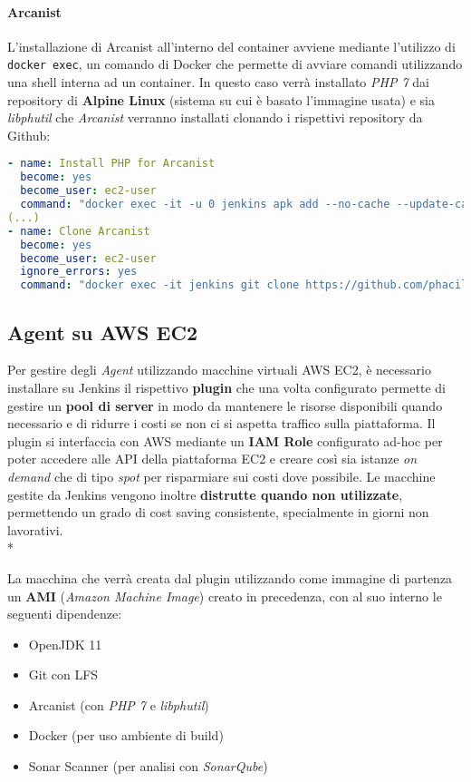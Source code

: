 \documentclass[../main.tex]{subfiles}
\begin{document}
    	    \paragraph{Arcanist}
    	    L'installazione di Arcanist all'interno del container avviene mediante l'utilizzo di \verb|docker exec|, un comando di Docker che permette di avviare comandi utilizzando una shell interna ad un container. In questo caso verrà installato \emph{PHP 7} dai repository di \textbf{Alpine Linux} (sistema su cui è basato l'immagine usata) e sia \emph{libphutil} che \emph{Arcanist} verranno installati clonando i rispettivi repository da Github:
    	    \begin{lstlisting}[language=yaml]
- name: Install PHP for Arcanist
  become: yes
  become_user: ec2-user
  command: "docker exec -it -u 0 jenkins apk add --no-cache --update-cache php7 php7-curl php7-json"
(...)
- name: Clone Arcanist
  become: yes
  become_user: ec2-user
  ignore_errors: yes
  command: "docker exec -it jenkins git clone https://github.com/phacility/arcanist.git /var/jenkins_home/arcanist"
    	    \end{lstlisting}
    	
        	\subsection{Agent su AWS EC2}
        	
        	    Per gestire degli \emph{Agent} utilizzando macchine virtuali AWS EC2, è necessario installare su Jenkins il rispettivo \textbf{plugin} che una volta configurato permette di gestire un \textbf{pool di server} in modo da mantenere le risorse disponibili quando necessario e di ridurre i costi se non ci si aspetta traffico sulla piattaforma. Il plugin si interfaccia con AWS mediante un \textbf{IAM Role} configurato ad-hoc per poter accedere alle API della piattaforma EC2 e creare così sia istanze \emph{on demand} che di tipo \emph{spot} per risparmiare sui costi dove possibile. Le macchine gestite da Jenkins vengono inoltre \textbf{distrutte quando non utilizzate}, permettendo un grado di cost saving consistente, specialmente in giorni non lavorativi.\\*
        	    
        	    La macchina che verrà creata dal plugin utilizzando come immagine di partenza un \textbf{AMI} (\emph{Amazon Machine Image}) creato in precedenza, con al suo interno le seguenti dipendenze:
        	    \begin{itemize}
        	        \item OpenJDK 11
        	        \item Git con LFS
        	        \item Arcanist (con \emph{PHP 7} e \emph{libphutil})
        	        \item Docker (per uso ambiente di build)
        	        \item Sonar Scanner (per analisi con \emph{SonarQube})
        	    \end{itemize}
        	    
\end{document}
